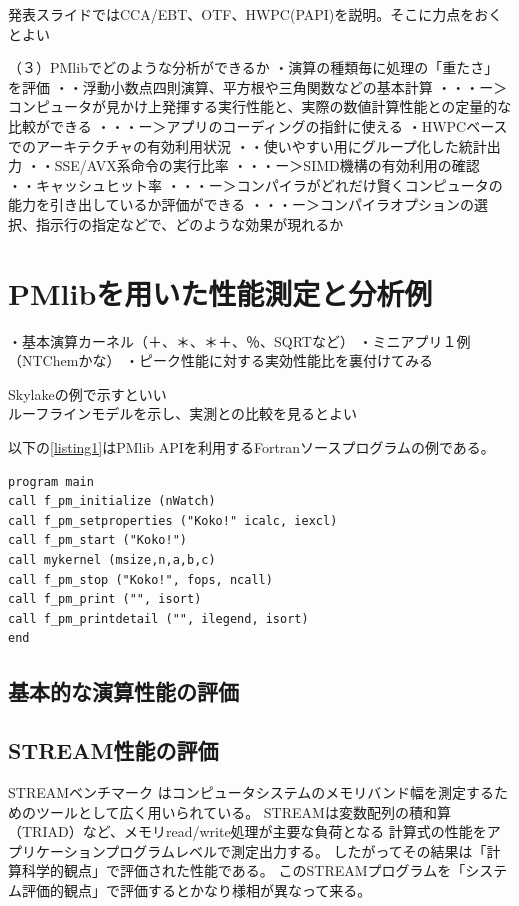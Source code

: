 \documentclass[submit,techrep,noauthor]{ipsj}
\begin{document}
{ \color{BLUE}
発表スライドではCCA/EBT、OTF、HWPC(PAPI)を説明。そこに力点をおくとよい\\
}

（３）PMlibでどのような分析ができるか
・演算の種類毎に処理の「重たさ」を評価
・・浮動小数点四則演算、平方根や三角関数などの基本計算
・・・ー＞コンピュータが見かけ上発揮する実行性能と、実際の数値計算性能との定量的な比較ができる
・・・ー＞アプリのコーディングの指針に使える
・HWPCベースでのアーキテクチャの有効利用状況
・・使いやすい用にグループ化した統計出力
・・SSE/AVX系命令の実行比率
・・・ー＞SIMD機構の有効利用の確認
・・キャッシュヒット率
・・・ー＞コンパイラがどれだけ賢くコンピュータの能力を引き出しているか評価ができる
・・・ー＞コンパイラオプションの選択、指示行の指定などで、どのような効果が現れるか


\section{PMlibを用いた性能測定と分析例}
・基本演算カーネル（＋、＊、＊＋、％、SQRTなど）
・ミニアプリ１例（NTChemかな）
・ピーク性能に対する実効性能比を裏付けてみる

{ \color{BLUE}
Skylakeの例で示すといい\\
ルーフラインモデルを示し、実測との比較を見るとよい\\
}

以下の\lstlistingname \ref{listing1}はPMlib APIを利用するFortranソースプログラムの例である。

\begin{lstlisting}[caption={\hfill},label={listing1},captionpos=t]
program main
call f_pm_initialize (nWatch)
call f_pm_setproperties ("Koko!" icalc, iexcl)
call f_pm_start ("Koko!")
call mykernel (msize,n,a,b,c)
call f_pm_stop ("Koko!", fops, ncall)
call f_pm_print ("", isort)
call f_pm_printdetail ("", ilegend, isort)
end
\end{lstlisting}

\subsection{基本的な演算性能の評価}
\subsection{STREAM性能の評価}
STREAMベンチマーク\cite{stream:1995}
はコンピュータシステムのメモリバンド幅を測定するためのツールとして広く用いられている。
STREAMは変数配列の積和算（TRIAD）など、メモリread/write処理が主要な負荷となる
計算式の性能をアプリケーションプログラムレベルで測定出力する。
したがってその結果は「計算科学的観点」で評価された性能である。
このSTREAMプログラムを「システム評価的観点」で評価するとかなり様相が異なって来る。
\end{document}
